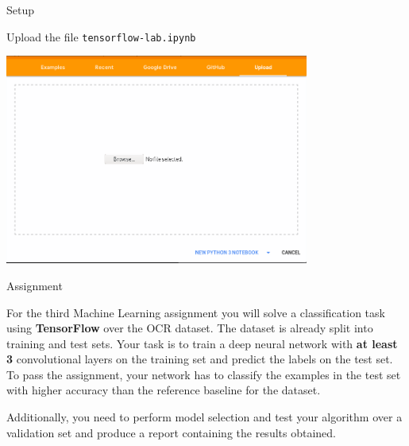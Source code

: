 \documentclass[10pt]{beamer}
\begin{document}
\begin{frame}{Setup}
\centering

Upload the file \texttt{tensorflow-lab.ipynb} \\
\vspace{0.2in}

\includegraphics[width=0.75\textwidth]{figures/upload}

\end{frame}




\begin{frame}{Assignment}
\centering

For the third Machine Learning assignment you will solve a classification task
using \textbf{TensorFlow} over the OCR dataset. The dataset is already split
into training and test sets. Your task is to train a deep
neural network with {\bf at least 3} convolutional layers on the training set and predict the labels on the test set. To
pass the assignment, your network has to classify the examples in the test
set with higher accuracy than the reference baseline for the dataset.

Additionally, you need to perform model selection and 
test your algorithm over a validation set
and produce a report containing the results obtained.


\end{frame}

\end{document}
